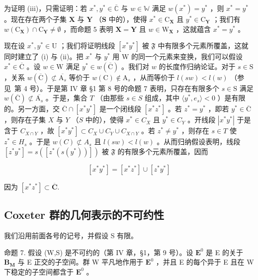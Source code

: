 为证明 (iii)，只需证明：若 \(x^{*}, y^{*} \in \overline{\mathbb{C}}\) 与 \(w \in \mathbb{W}\) 满足 \(w(x^{*}) = y^{*}\) ，则 \(x^{*} = y^{*}\) 。现在存在两个子集 \(\mathbf{X}\) 与 \(\mathbf{Y}\) （\(\mathbf{S}\) 中的），使得 \(x^{*} \in \mathrm{C}_{\mathbf{X}}\) 且 \(y^{*} \in \mathrm{C}_{\mathbf{Y}}\) ；我们有 \(w(\mathrm{C}_{\mathbf{X}}) \cap \mathrm{C}_{\mathbf{Y}} \neq \emptyset\) ，而命题 5 表明 \(\mathbf{X} = \mathbf{Y}\) 且 \(w \in \mathrm{W}_{\mathbf{X}}\) ，这就蕴含 \(x^{*} = y^{*}\) 。

现在设 \(x^{*}, y^{*} \in \mathrm{U}\) ；我们将证明线段 \([x^{*}y^{*}]\) 被 \(\mathfrak{F}\) 中有限多个元素所覆盖，这就同时建立了 (i) 与 (ii)。把 \(x^{*}\) 与 \(y^{*}\) 用 \(\mathrm{W}\) 的同一个元素来变换，我们可以假设 \(x^{*} \in \overline{\mathrm{C}}\) 。设 \(w \in \mathrm{W}\) 满足 \(y^{*} \in w(\overline{\mathrm{C}})\) 。我们对 \(w\) 的长度作归纳论证。对于 \(s \in \mathrm{S}\) ，关系 \(w(\overline{\mathrm{C}}) \not\subset \overline{\mathrm{A}_{s}}\) 等价于 \(w(\mathrm{C}) \notin \mathrm{A}_{s}\) ，从而等价于 \(l(sw) < l(w)\) （参见~第 4 号）。于是第 IV 章 §1 第 8 号的命题 7 表明，只存在有限多个 \(s \in \mathrm{S}\) 满足 \(w(\overline{\mathrm{C}}) \not\subset \overline{\mathrm{A}_{s}}\) 。于是，集合 \(T\) （由那些 \(s \in S\) 组成，其中 \(\langle y^{*}, e_{s} \rangle < 0\) ）是有限的。另一方面，交 \(\overline{\mathrm{C}} \cap [x^{*}y^{*}]\) 是一个闭线段 \([x^{*}z^{*}]\) 。若 \(z^{*} = y^{*}\) ，即若 \(y^{*} \in \overline{\mathrm{C}}\) ，则存在子集 \(X\) 与 \(Y\) （\(S\) 中的），使得 \(x^{*} \in C_{X}\) 且 \(y^{*} \in C_{Y}\) 。开线段 \(|x^{*}y^{*}|\) 于是含于 \(C_{X \cap Y}\) ，故 \([x^{*}y^{*}] \subset C_{X} \cup C_{Y} \cup C_{X \cap Y}\) 。若 \(z^{*} \neq y^{*}\) ，则存在 \(s \in T\) 使 \(z^{*} \in H_{s}\) 。于是 \(w(C) \not\subset A_{s}\) 且 \(l(sw) < l(w)\) 。从而归纳假设表明，线段 \([z^{*}y^{*}] = s([z^{*}(s(y^{*}))])\) 被 \(\mathfrak{F}\) 的有限多个元素所覆盖，因而

\[
\left[ x ^ {*} y ^ {*} \right] = \left[ x ^ {*} z ^ {*} \right] \cup \left[ z ^ {*} y ^ {*} \right]
\]

因为 \([x^{*}z^{*}]\subset \overline{\mathbf{C}}.\)

\subsection{Coxeter 群的几何表示的不可约性}

我们沿用前面各号的记号，并假设 S 有限。

命题 7. 假设 (W,S) 是不可约的（第 IV 章，§1，第 9 号）。设 \(\mathbf{E}^0\) 是 E 的关于 \(\mathbf{B}_{\mathbf{M}}\) 与 E 正交的子空间。群 W 平凡地作用于 \(\mathbf{E}^0\) ，并且 E 的每个异于 E 且在 W 下稳定的子空间都含于 \(\mathbf{E}^0\) 。

